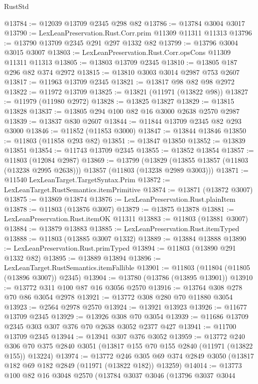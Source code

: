 \begin{lexlean}{RustStd}
\begin{coremodule}
@13784 := @12039 @13709 @2345 @298 @82
@13786 := @13784 @3004 @3017
@13790 := LexLeanPreservation.Rust.Corr.prim @11309 @11311 @11313
@13796 := @13790 @13709 @2345 @291 @297 @1332 @82
@13799 := @13796 @3004 @3015 @3007
@13803 := LexLeanPreservation.Rust.Corr.opsCons @11309 @11311 @11313
@13805 := @13803 @13709 @2345
@13810 := @13805 @187 @296 @82 @374 @2972
@13815 := @13810 @3003 @3014 @2987 @753 @2607
@13817 := @11963 @13709 @2345
@13821 := @13817 @98 @82 @98 @2972
@13822 := @11972 @13709
@13825 := @13821 (@11971 (@13822 @98))
@13827 := @11979 (@11980 @2972)
@13828 := @13825 @13827
@13829 := @13815 @13828
@13837 := @13805 @294 @100 @82 @16 @3000 @2638 @2570 @2987
@13839 := @13837 @830 @2607
@13844 := @11844 @13709 @2345 @82 @293 @3000
@13846 := @11852 (@11853 @3000)
@13847 := @13844 @13846
@13850 := @11803 (@11858 @293 @82)
@13851 := @13847 @13850
@13852 := @13839 @13851
@13854 := @11743 @13709 @2345
@13855 := @13852 @13854
@13857 := @11803 (@12084 @2987)
@13869 := @13799
    (@13829 (@13855 @13857 (@11803 (@13238 @2995 @2638))) @13857 (@11803 (@13238 @2989 @3003)))
@13871 := @11540 LexLeanTarget.TargetSyntax.Prim
@13872 := LexLeanTarget.RustSemantics.itemPrimitive
@13874 := @13871 (@13872 @3007)
@13875 := @13869 @13874
@13876 := LexLeanPreservation.Rust.plainItem
@13878 := @11803 (@13876 @3007)
@13879 := @13875 @13878
@13881 := LexLeanPreservation.Rust.itemOK @11311
@13883 := @11803 (@13881 @3007)
@13884 := @13879 @13883
@13885 := LexLeanPreservation.Rust.itemTyped
@13888 := @11803 (@13885 @3007 @1332)
@13889 := @13884 @13888
@13890 := LexLeanPreservation.Rust.primTyped
@13894 := @11803 (@13890 @291 @1332 @82)
@13895 := @13889 @13894
@13896 := LexLeanTarget.RustSemantics.itemFallible
@13901 := @11803 (@11804 (@11805 (@13896 @3007)) @2345)
@13904 := @13780 (@13786 (@13895 @13901))
@13910 := @13772 @311 @100 @87 @16 @3056 @2570
@13916 := @13764 @308 @278 @70 @86 @3054 @2978
@13921 := @13772 @308 @280 @70 @11880 @3054
@13923 := @2564 @2978 @2570
@13924 := @13921 @13923
@13926 := @11677 @13709 @2345
@13929 := @13926 @308 @70 @3054
@13939 := @11686 @13709 @2345 @303 @307 @376 @70 @2638 @3052 @2377 @427
@13941 := @11700 @13709 @2345
@13944 := @13941 @307 @376 @3052
@13959 := @13772
    @240
    @306
    @70
    @375
    @2840
    @3051
    (@13817 @155 @70 @155 @2840 (@11971 (@13822 @155)) @13224)
@13974 := @13772
    @246
    @305
    @69
    @374
    @2849
    @3050
    (@13817 @182 @69 @182 @2849 (@11971 (@13822 @182)) @13259)
@14014 := @13773
    @100
    @82
    @16
    @3048
    @2570
    (@13784
      @3037
      @3046
      (@13796
        @3037
        @3044

\end{coremodule}
\end{lexlean}
